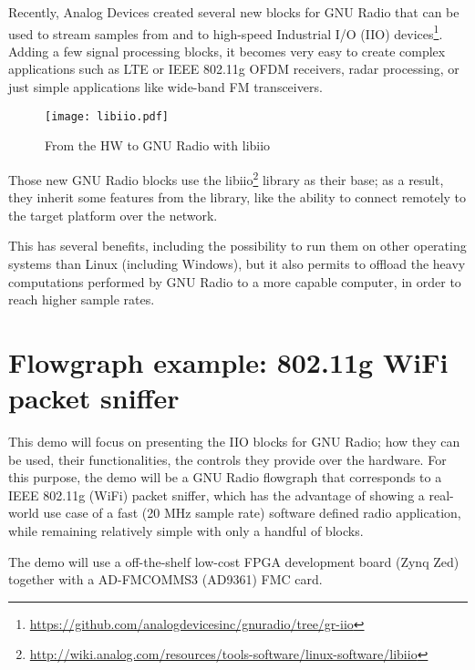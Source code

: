\documentclass{acm_proc_article-sp}
\begin{document}
Recently, Analog Devices created several new blocks for GNU Radio that can be
used to stream samples from and to high-speed Industrial I/O (IIO)
devices\footnote{\url{https://github.com/analogdevicesinc/gnuradio/tree/gr-iio}}.
Adding a few signal processing
blocks, it becomes very easy to create complex applications such as
LTE or IEEE 802.11g OFDM receivers, radar processing, or just simple
applications like wide-band FM transceivers.

\begin{figure}[htbp]
\centering
\texttt{[image: libiio.pdf]}
\caption{From the HW to GNU Radio with libiio}
\end{figure}

Those new GNU Radio blocks use the
libiio\footnote{\url{http://wiki.analog.com/resources/tools-software/linux-software/libiio}}
library as their base; as a result,
they inherit some features from the library, like the ability to connect
remotely to the target platform over the network.

This has several benefits, including the possibility to run them on other
operating systems than Linux (including Windows), but it also permits to
offload the heavy computations performed by GNU Radio to a more capable computer,
in order to reach higher sample rates.

\section{Flowgraph example: 802.11g WiFi packet sniffer}

This demo will focus on presenting the IIO blocks for GNU Radio; how they can be
used, their functionalities, the controls they provide over the hardware.
For this purpose, the demo will be a GNU Radio flowgraph that corresponds to a
IEEE 802.11g (WiFi) packet sniffer, which has the advantage of showing a
real-world use case of a fast (20 MHz sample rate) software defined radio
application, while remaining relatively simple with only a handful of blocks.

The demo will use a off-the-shelf low-cost FPGA development board (Zynq Zed)
together with a AD-FMCOMMS3 (AD9361) FMC card.

\balancecolumns
\end{document}
